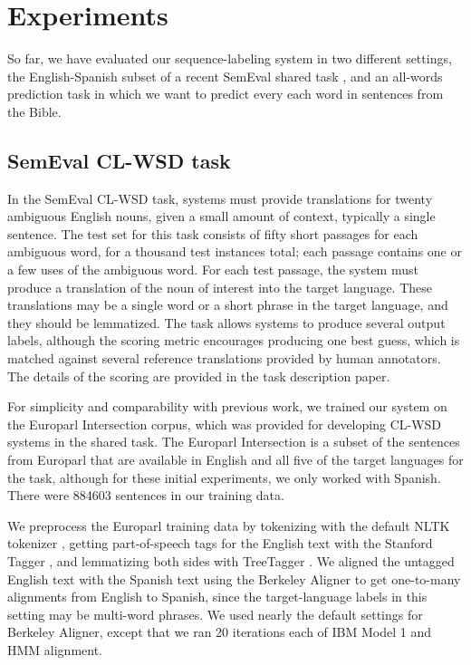 \documentclass[11pt]{article}
\begin{document}
\section{Experiments}
So far, we have evaluated our sequence-labeling system in two different
settings, the English-Spanish subset of a recent SemEval shared task
\cite{task10}, and an all-words prediction task in which we want to predict
every each word in sentences from the Bible.

\subsection{SemEval CL-WSD task}
In the SemEval CL-WSD task, systems must provide translations for twenty
ambiguous English nouns, given a small amount of context, typically a single
sentence. The test set for this task consists of fifty short passages for each
ambiguous word, for a thousand test instances total; each passage contains one
or a few uses of the ambiguous word. For each test passage, the system must
produce a translation of the noun of interest into the target language.  These
translations may be a single word or a short phrase in the target language, and
they should be lemmatized. The task allows systems to produce several output
labels, although the scoring metric encourages producing one best guess, which
is matched against several reference translations provided by human annotators.
The details of the scoring are provided in the task description paper.

For simplicity and comparability with previous work, we trained our system on
the Europarl Intersection corpus, which was provided for developing CL-WSD
systems in the shared task.  The Europarl Intersection is a subset of the
sentences from Europarl \cite{europarl} that are available in English and all
five of the target languages for the task, although for these initial
experiments, we only worked with Spanish. There were 884603 sentences in our
training data.

We preprocess the Europarl training data by tokenizing with the default NLTK
tokenizer \cite{nltkbook}, getting part-of-speech tags for the English text
with the Stanford Tagger \cite{Toutanova03feature-richpart-of-speech}, and
lemmatizing both sides with TreeTagger \cite{Schmid95improvementsin}.  We
aligned the untagged English text with the Spanish text using the Berkeley
Aligner \cite{denero-klein:2007:ACLMain} to get one-to-many alignments from
English to Spanish, since the target-language labels in this setting may be
multi-word phrases. We used nearly the default settings for Berkeley Aligner,
except that we ran 20 iterations each of IBM Model 1 and HMM alignment.
\end{document}
